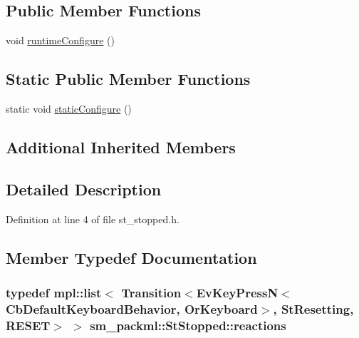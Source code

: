 \subsection*{Public Member Functions}
\begin{DoxyCompactItemize}
\item 
void \hyperlink{structsm__packml_1_1StStopped_ab528cd96bea69cd24c9f983b24a76613}{runtime\+Configure} ()
\end{DoxyCompactItemize}
\subsection*{Static Public Member Functions}
\begin{DoxyCompactItemize}
\item 
static void \hyperlink{structsm__packml_1_1StStopped_a84b427f80c9eb93589568de34c5d6817}{static\+Configure} ()
\end{DoxyCompactItemize}
\subsection*{Additional Inherited Members}


\subsection{Detailed Description}


Definition at line 4 of file st\+\_\+stopped.\+h.



\subsection{Member Typedef Documentation}
\subsubsection[{\texorpdfstring{reactions}{reactions}}]{\setlength{\rightskip}{0pt plus 5cm}typedef mpl\+::list$<$ Transition$<$Ev\+Key\+PressN$<$Cb\+Default\+Keyboard\+Behavior, {\bf Or\+Keyboard}$>$, {\bf St\+Resetting}, {\bf R\+E\+S\+ET}$>$ $>$ {\bf sm\+\_\+packml\+::\+St\+Stopped\+::reactions}}\hypertarget{structsm__packml_1_1StStopped_a367bf88fe1a8e8b373732280733d1c02}{}\label{structsm__packml_1_1StStopped_a367bf88fe1a8e8b373732280733d1c02}


